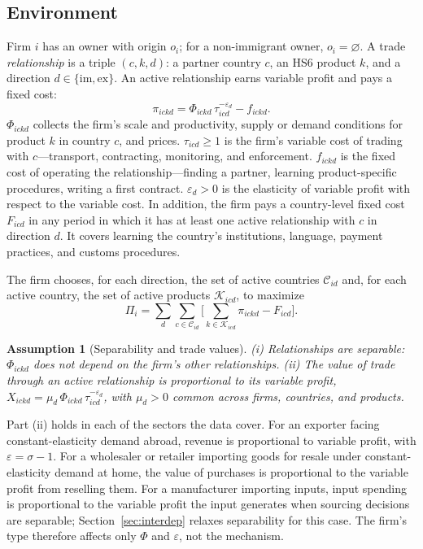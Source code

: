 \documentclass[12pt]{article}
\newtheorem{assumption}{Assumption}
\theoremstyle{remark}
\begin{document}
\subsection{Environment}

Firm $i$ has an owner with origin $o_i$; for a non-immigrant owner,
$o_i=\varnothing$. A trade \emph{relationship} is a triple $(c,k,d)$: a
partner country $c$, an HS6 product $k$, and a direction
$d\in\{\text{im},\text{ex}\}$. An active relationship earns variable profit
and pays a fixed cost:
\begin{equation}
\pi_{ickd} = \Phi_{ickd}\,\tau_{icd}^{-\varepsilon_d} - f_{ickd}.
\label{eq:pi}
\end{equation}
$\Phi_{ickd}$ collects the firm's scale and productivity, supply or demand
conditions for product $k$ in country $c$, and prices. $\tau_{icd}\geq1$ is the
firm's variable cost of trading with $c$---transport, contracting, monitoring,
and enforcement. $f_{ickd}$ is the fixed cost of operating the
relationship---finding a partner, learning product-specific procedures,
writing a first contract. $\varepsilon_d>0$ is the elasticity of variable profit
with respect to the variable cost. In addition, the firm pays a country-level
fixed cost $F_{icd}$ in any period in which it has at least one active
relationship with $c$ in direction $d$. It covers learning the country's
institutions, language, payment practices, and customs procedures.

The firm chooses, for each direction, the set of active countries
$\mathcal{C}_{id}$ and, for each active country, the set of active products
$\mathcal{K}_{icd}$, to maximize
\begin{equation}
\Pi_i = \sum_{d}\sum_{c\in\mathcal{C}_{id}}\Big[\sum_{k\in\mathcal{K}_{icd}}
\pi_{ickd} - F_{icd}\Big].
\label{eq:Pi}
\end{equation}

\begin{assumption}[Separability and trade values]\label{ass:sep}
(i) Relationships are separable: $\Phi_{ickd}$ does not depend on the firm's
other relationships. (ii) The value of trade through an active relationship is
proportional to its variable profit, $X_{ickd}=\mu_d\,\Phi_{ickd}\,
\tau_{icd}^{-\varepsilon_d}$, with $\mu_d>0$ common across firms, countries,
and products.
\end{assumption}

Part (ii) holds in each of the sectors the data cover. For an exporter facing
constant-elasticity demand abroad, revenue is proportional to variable
profit, with $\varepsilon=\sigma-1$. For a wholesaler or retailer importing
goods for resale under constant-elasticity demand at home, the value of
purchases is proportional to the variable profit from reselling them. For a
manufacturer importing inputs, input spending is proportional to the
variable profit the input generates when sourcing decisions are separable;
Section~\ref{sec:interdep} relaxes separability for this case. The firm's
type therefore affects only $\Phi$ and $\varepsilon$, not the mechanism.
\end{document}
